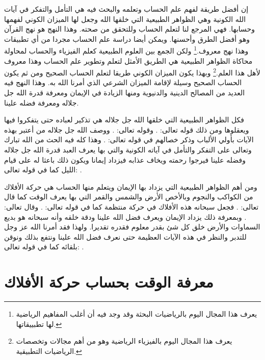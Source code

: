 إن أفضل طريقة لفهم علم الحساب وتعلمه والبحث فيه هي التأمل والتفكر في آيات الله الكونية وهي الظواهر الطبيعية التي خلقها الله وجعل لها الميزان الكوني لفهمها وحسابها. فهي المرجع لنا لتعلم الحساب وللتحقق من صحته. وهذا النهج هو نهج القرآن وهو أفضل الطرق وأحسنها. ويمكن أيضا دراسة علم الحساب مجردا من أي تطبيقات وهذا نهج معروف.\footnote{يعرف هذا المجال اليوم بالرياضيات البحثة وقد وجد فيه أن أغلب المفاهيم الرياضية لها تطبييقاتها.} ولكن الجمع بين العلوم الطبيعية كعلم الفيزياء والحساب لمحاولة محاكاة الظواهر الطبيعية هي الطريق الأمثل لتعلم وتطوير علم الحساب وهذا معروف لأهل هذا العلم.\footnote{يعرف هذا المجال اليوم بالفيزياء الرياضية وهو من أهم مجالات وتخصصات الرياضيات التطبيقية.} وبهذا يكون الميزان الكوني طريقا لتعلم الحساب الصحيح ومن ثم يكون الحساب الصحيح وسيلة لإقامة الميزان الشرعي الذي أمرنا الله به. وهذا النهج فيه العديد من المصالح الدينية والدنيوية ومنها الزيادة في الإيمان ومعرفة قدرة الله جل جلاله ومعرفة فضله علينا.

فكل الظواهر الطبيعية التي خلقها الله جل جلاله هي تذكير لعباده حتى يتفكروا فيها ويعقلوها ومن ذلك قوله تعالى: \quranayah*[30][24]{\footnotesize \surahname*[30]}. وقوله تعالى: \quranayah*[45][13]{\footnotesize \surahname*[45]}. ووصف الله جل جلاله من أعتبر بهذه الآيات بأولي الألباب وذكر خصالهم في قوله تعالى: \quranayah*[3][190-191]{\footnotesize \surahname*[3]}. وهذا كله فيه الحث من الله تبارك وتعالى على التفكر والتأمل في آياته الكونية والتي بها يعرف العبد قدرة الله جل جلاله وفضله علينا فيرجوا رحمته ويخاف عذابه فيزداد إيمانا ويكون ذلك باعثا له على قيام الليل كما في قوله تعالى: \quranayah*[39][9]{\footnotesize \surahname*[3]}.

ومن أهم الظواهر الطبيعية التي يزداد بها الإيمان ويتعلم منها الحساب هي حركة الأفلاك من الكواكب والنجوم وبالأخص الأرض والشمس والقمر التي بها يعرف الوقت كما قال تعالى: \quranayah*[16][12]{\footnotesize \surahname*[16]}. فجعل سبحانه هذه الأفلاك في حركة منتظمة كما في قوله تعالى: \quranayah*[21][33]{\footnotesize \surahname*[21]}. وقال تعالى: \quranayah*[36][40]{\footnotesize \surahname*[36]}. وبمعرفة ذلك يزداد الإيمان ويعرف فضل الله علينا ودقة خلقه وأنه سبحانه هو بديع السماوات والأرض خلق كل شئ بقدر معلوم فقدره تقديرا. ولهذا فقد أمرنا الله عز وجل للتدبر والنظر في هذه الآيات العظيمة حتى نعرف فضل الله علينا ونتفع بذلك ونوقن بلقائه كما في قوله تعالى: \quranayah*[13][2]{\footnotesize \surahname*[13]}.

\section{معرفة الوقت بحساب حركة الأفلاك}

